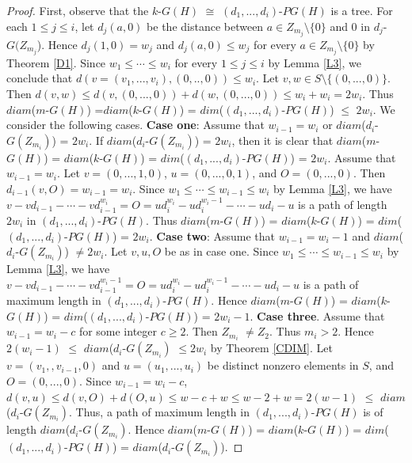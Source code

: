 \documentclass{amsart}
\theoremstyle{plain}
\begin{document}
			\begin{proof}
			First, observe that the $k$-$G(H)$ $\cong$ $(d_1, ... , d_i)$-$PG(H)$ is a tree. For each $1\leq j \leq i$, let $d_j(a, 0)$ be the distance between $a \in Z_{m_j} \setminus \{0\}$ and 0 in $d_j$-$G(Z_{m_j}$). Hence $d_j(1, 0) = w_j$ and $d_j(a, 0) \leq w_j$ for every $a\in Z_{m_j} \setminus \{0\}$ by Theorem \ref{D1}. Since $w_1 \leq \cdots \leq w_i$ for every $1 \leq j \leq i$ by Lemma \ref{L3}, we conclude that $d(v=(v_1, ... , v_i), (0, .., 0)) \leq w_i$.  Let $v, w \in S\setminus \{(0, ..., 0)\}$. Then $d(v, w) \leq d(v, (0, ..., 0)) + d(w, (0, ... , 0)) \leq w_i + w_i = 2w_i$. Thus $diam$($m$-$G(H)$) =$diam$($k$-$G(H)$) = $dim$($(d_1, ... , d_i)$-$PG(H)$) $\leq$  $2w_i$. We consider the following cases. {\bf Case one}: Assume that $w_{i-1} = w_i$ or $diam$($d_i$-$G(Z_{m_i})$) = $2w_i$. If $diam$($d_i$-$G(Z_{m_i})$) = $2w_i$, then it is clear that $diam$($m$-$G(H)$) = $diam$($k$-$G(H)$) = $dim$($(d_1, ... , d_i)$-$PG(H)$) =  $2w_i$. Assume that $w_{i-1} = w_i$. Let $v = (0, ... , 1, 0)$, $u = (0, ..., 0, 1)$, and $O = (0, ... , 0)$. Then $d_{i-1}(v, O) = w_{i-1} = w_i$. Since $w_1 \leq \cdots \leq w_{i-1} \leq w_i$ by Lemma \ref{L3}, we have  $v-vd_{i-1}-\cdots - vd_{i-1}^{w_i}=O=ud_i^{w_i}-ud_i^{w_i - 1}-\cdots -ud_i-u$ is a path of length $2w_i$ in $(d_1, ... , d_i)$-$PG(H)$. Thus $diam$($m$-$G(H)$) = $diam$($k$-$G(H)$) = $dim$($(d_1, ... , d_i)$-$PG(H)$) =  $2w_i$. {\bf Case two}: Assume that $w_{i-1} = w_i - 1$ and $diam$($d_i$-$G(Z_{m_i})$) $\not = 2w_i$. Let $v, u, O$ be as in case one. Since $w_1 \leq \cdots \leq w_{i-1} \leq w_i$ by Lemma \ref{L3}, we have $v-vd_{i-1}-\cdots - vd_{i-1}^{w_i-1}= O = ud_i^{w_i}-ud_i^{w_i - 1}-\cdots -ud_i-u$ is a path of maximum length in $(d_1, ... , d_i)$-$PG(H)$. Hence $diam$($m$-$G(H)$) = $diam$($k$-$G(H)$) = $dim$($(d_1, ... , d_i)$-$PG(H)$) =  $2w_i - 1$. {\bf Case three}. Assume that $w_{i-1} = w_i - c$ for some integer $c \geq 2$. Then $Z_{m_i}$ $\not = Z_2$. Thus $m_i > 2$. Hence $2(w_i - 1)$ $\leq$ $diam$($d_i$-$G(Z_{m_i})$ $\leq 2w_i$ by Theorem \ref{CDIM}. Let $v = (v_1, , v_{i-1}, 0)$ and $u = (u_1, ... , u_i)$ be distinct nonzero elements in $S$, and $O = (0, ..., 0)$. Since $w_{i-1} = w_i - c$, $d(v, u) \leq d(v, O) + d(O, u) \leq  w - c + w \leq w-2 + w = 2(w-1)$ $\leq$ $diam$($d_i$-$G(Z_{m_i})$. Thus, a path of maximum length in $(d_1, ... , d_i)$-$PG(H)$ is of length $diam$($d_i$-$G(Z_{m_i})$. Hence $diam$($m$-$G(H)$) = $diam$($k$-$G(H)$) = $dim$($(d_1, ... , d_i)$-$PG(H)$) =  $diam$($d_i$-$G(Z_{m_i})$).
			
			\end{proof}
\end{document}
